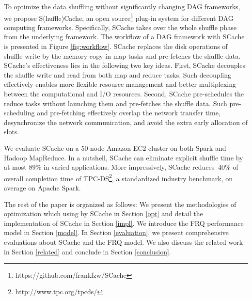 {\color{black}
To optimize the data shuffling without significantly changing DAG frameworks, we propose S(huffle)Cache, an open source\footnote{https://github.com/frankfzw/SCache} plug-in system for different DAG computing frameworks.
Specifically, SCache takes over the whole shuffle phase from the underlying framework.
The workflow of a DAG framework with SCache is presented in Figure \ref{fig:workflow}. 
SCache replaces the disk operations of shuffle write by the memory copy in map tasks and pre-fetches the shuffle data.
SCache's effectiveness lies in the following two key ideas.
First, SCache decouples the shuffle write and read from both map and reduce tasks.
Such decoupling effectively enables more flexible resource management and better multiplexing between the computational and I/O resources.
Second, SCache pre-schedules the reduce tasks without launching them and pre-fetches the shuffle data. 
Such pre-scheduling and pre-fetching effectively overlap the network transfer time, desynchronize the network communication, 
and avoid the extra early allocation of slots.

We evaluate SCache on a 50-node Amazon EC2 cluster on both Spark and Hadoop MapReduce.
In a nutshell, SCache can eliminate explicit shuffle time by at most $89\%$ in varied applications. More impressively, SCache reduces $~40\%$ of overall completion time of TPC-DS\footnote{http://www.tpc.org/tpcds/}, a standardized industry benchmark, on average on Apache Spark.

The rest of the paper is organized as follows:
{\color{black}
We present the methodologies of optimization which using by SCache in Section \ref{opt} and detail the implementation of SCache in Section \ref{impl}.
We introduce the FRQ performance model in Section \ref{model}.
In Section \ref{evaluation}, we present comprehensive evaluations about SCache and the FRQ model.
We also discuss the related work in Section \ref{related} and conclude in Section \ref{conclusion}.
}
}

